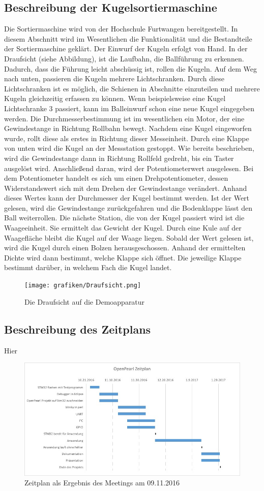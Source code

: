 \documentclass[12pt,a4paper]{article}
\begin{document}
\subsection{Beschreibung der Kugelsortiermaschine}
Die Sortiermaschine wird von der Hochschule Furtwangen bereitgestellt. In diesem Abschnitt wird im Wesentlichen die Funktionalität und die Bestandteile der Sortiermaschine geklärt.
Der Einwurf der Kugeln erfolgt von Hand. In der Draufsicht (siehe Abbildung), ist die Laufbahn, die Ballführung zu erkennen. Dadurch, dass die Führung leicht abschüssig ist, rollen die Kugeln. Auf dem Weg nach unten, passieren die Kugeln mehrere Lichtschranken. Durch diese Lichtschranken ist es möglich, die Schienen in Abschnitte einzuteilen und mehrere Kugeln gleichzeitig erfassen zu können. Wenn beispielsweise eine Kugel Lichtschranke 3 passiert, kann im Balleinwurf schon eine neue Kugel eingegeben werden. Die Durchmesserbestimmung ist im wesentlichen ein Motor, der eine Gewindestange in Richtung Rollbahn bewegt. Nachdem eine Kugel eingeworfen wurde, rollt diese als erstes in Richtung dieser Messeinheit. Durch eine Klappe von unten wird die Kugel an der Messstation gestoppt. Wie bereits beschrieben, wird die Gewindestange dann in Richtung Rollfeld gedreht, bis ein Taster ausgelöst wird. Anschließend daran, wird der Potentiometerwert ausgelesen. Bei dem Potentiometer handelt es sich um einen Drehpotentiometer, dessen Widerstandswert sich mit dem Drehen der Gewindestange verändert. Anhand dieses Wertes kann der Durchmesser der Kugel bestimmt werden. Ist der Wert gelesen, wird die Gewindestange zurückgefahren und die Bodenklappe lässt den Ball weiterrollen. Die nächste Station, die von der Kugel passiert wird ist die Waageeinheit. Sie ermittelt das Gewicht der Kugel. Durch eine Kule auf der Waagefläche bleibt die Kugel auf der Waage liegen. Sobald der Wert gelesen ist, wird die Kugel durch einen Bolzen herausgeschossen. Anhand der ermittelten Dichte wird dann bestimmt, welche Klappe sich öffnet. Die jeweilige Klappe bestimmt darüber, in welchem Fach die Kugel landet.
\begin{figure}[ht]
\begin{center}
\texttt{[image: grafiken/Draufsicht.png]}
\caption{Die Draufsicht auf die Demoapparatur}
\label{draufsicht_sortiermaschine}
\end{center}
\end{figure}

\subsection{Beschreibung des Zeitplans}
Hier
\begin{figure}[ht]
\begin{center}
\includegraphics[width=12cm]{grafiken/zeitplan.jpg}
\caption{Zeitplan als Ergebnis des Meetings am 09.11.2016}
\label{zeitplan}
\end{center}
\end{figure}
\end{document}
